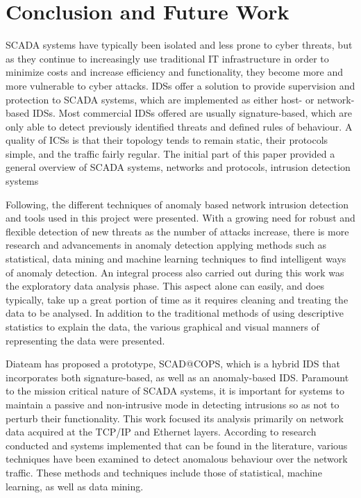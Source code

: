 \documentclass[12pt,]{article}
\begin{document}
\pagebreak

\section{Conclusion and Future Work}\label{conclusion-and-future-work}

SCADA systems have typically been isolated and less prone to cyber
threats, but as they continue to increasingly use traditional IT
infrastructure in order to minimize costs and increase efficiency and
functionality, they become more and more vulnerable to cyber attacks.
IDSs offer a solution to provide supervision and protection to SCADA
systems, which are implemented as either host- or network-based IDSs.
Most commercial IDSs offered are usually signature-based, which are only
able to detect previously identified threats and defined rules of
behaviour. A quality of ICSs is that their topology tends to remain
static, their protocols simple, and the traffic fairly regular. The
initial part of this paper provided a general overview of SCADA systems,
networks and protocols, intrusion detection systems

Following, the different techniques of anomaly based network intrusion
detection and tools used in this project were presented. With a growing
need for robust and flexible detection of new threats as the number of
attacks increase, there is more research and advancements in anomaly
detection applying methods such as statistical, data mining and machine
learning techniques to find intelligent ways of anomaly detection. An
integral process also carried out during this work was the exploratory
data analysis phase. This aspect alone can easily, and does typically,
take up a great portion of time as it requires cleaning and treating the
data to be analysed. In addition to the traditional methods of using
descriptive statistics to explain the data, the various graphical and
visual manners of representing the data were presented.

Diateam has proposed a prototype, SCAD@COPS, which is a hybrid IDS that
incorporates both signature-based, as well as an anomaly-based IDS.
Paramount to the mission critical nature of SCADA systems, it is
important for systems to maintain a passive and non-intrusive mode in
detecting intrusions so as not to perturb their functionality. This work
focused its analysis primarily on network data acquired at the TCP/IP
and Ethernet layers. According to research conducted and systems
implemented that can be found in the literature, various techniques have
been examined to detect anomalous behaviour over the network traffic.
These methods and techniques include those of statistical, machine
learning, as well as data mining.
\end{document}
